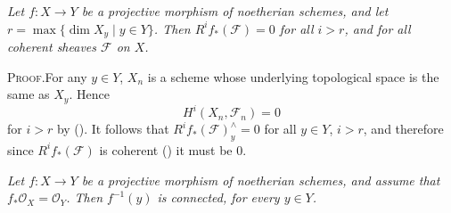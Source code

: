 { \emph{Let $f\colon X\to Y$ be a projective morphism of noetherian schemes, and let $r=\max\{\dim X_y\mid y\in Y\}$. Then $R^if_*(\mathcal F)=0$ for all $i>r$, and for all coherent sheaves $\mathcal F$ on $X$.}

\par\smallskip\noindent\textsc{Proof.}\enspace For any $y\in Y$, $X_n$ is a scheme whose underlying topological space is the same as $X_y$. Hence
\[
 H^i(X_n,\mathcal F_n)=0
\]
for $i>r$ by (). It follows that $R^if_*(\mathcal F)_y^\wedge=0$ for all $y\in Y$, $i>r$, and therefore since $R^if_*(\mathcal F)$ is coherent () it must be $0$.

 \emph{Let $f\colon X\to Y$ be a projective morphism of noetherian schemes, and assume that $f_*\mathcal O_X=\mathcal O_Y$. Then $f^{-1}(y)$ is connected, for every $y\in Y$.}
}
